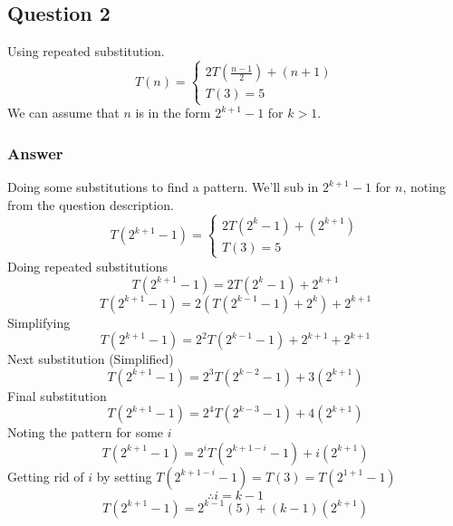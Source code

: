 \documentclass[12pt]{article}
\begin{document}

\subsection{Question 2}
Using repeated substitution.
\begin{displaymath} 
	T(n)=
	\begin{cases}
		2 T(\frac{n-1}{2})+(n+1) \\
		T(3) = 5
	\end{cases}
\end{displaymath}
We can assume that $ n $ is in the form $ 2^{k+1}-1 $ for $ k > 1 $.
\subsubsection{Answer}
Doing some substitutions to find a pattern.
We'll sub in $ 2^{k+1}-1 $ for $ n $, noting from the question description.
\begin{displaymath}
	T(2^{k+1}-1)=
	\begin{cases}
		2 T(2^k-1)+(2^{k+1}) \\
		T(3) = 5
	\end{cases}
\end{displaymath}
Doing repeated substitutions
\begin{displaymath}
	T(2^{k+1}-1)=2T(2^k-1)+2^{k+1}
\end{displaymath}
\begin{displaymath}
	T(2^{k+1}-1)=2(T(2^{k-1}-1)+2^{k})+2^{k+1}
\end{displaymath}
Simplifying
\begin{displaymath}
	T(2^{k+1}-1)=2^2 T(2^{k-1}-1)+2^{k+1}+2^{k+1}
\end{displaymath}
Next substitution (Simplified)
\begin{displaymath}
	T(2^{k+1}-1)=2^3 T(2^{k-2}-1)+3(2^{k+1})
\end{displaymath}
Final substitution
\begin{displaymath}
	T(2^{k+1}-1)=2^4 T(2^{k-3}-1)+4(2^{k+1})
\end{displaymath}
Noting the pattern for some $i$
\begin{displaymath}
	T(2^{k+1}-1)=2^i T(2^{k+1-i}-1)+i(2^{k+1})
\end{displaymath}
Getting rid of $i$ by setting $T(2^{k+1-i}-1)=T(3)=T(2^{1+1}-1)$
\begin{displaymath}
	\therefore i=k-1
\end{displaymath}
\begin{displaymath}
	T(2^{k+1}-1)=2^{k-1}(5)+(k-1)(2^{k+1})
\end{displaymath}
\end{document}
